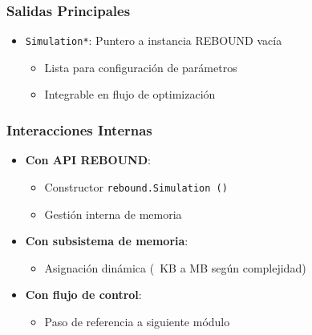 \subsubsection{Salidas Principales}
\begin{itemize}
    \item \texttt{Simulation*}: Puntero a instancia REBOUND vacía
    \begin{itemize}
        \item Lista para configuración de parámetros
        \item Integrable en flujo de optimización
    \end{itemize}
\end{itemize}

\subsubsection{Interacciones Internas}
\begin{itemize}
    \item \textbf{Con API REBOUND}:
    \begin{itemize}
        \item Constructor \texttt{rebound.Simulation~()}
        \item Gestión interna de memoria
    \end{itemize}
    \item \textbf{Con subsistema de memoria}:
    \begin{itemize}
        \item Asignación dinámica (~KB a MB según complejidad)
    \end{itemize}
    \item \textbf{Con flujo de control}:
    \begin{itemize}
        \item Paso de referencia a siguiente módulo
    \end{itemize}
\end{itemize}
\newpage

